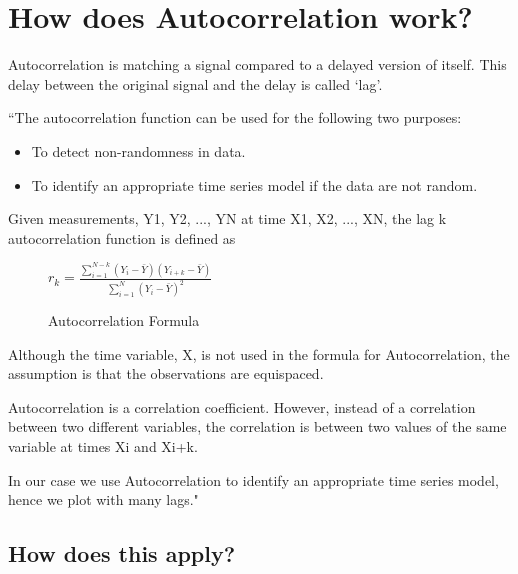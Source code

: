 \section{How does Autocorrelation work?}
Autocorrelation is matching a signal compared to a delayed version of itself. This delay between the original signal and the delay is called ‘lag'. 

``The autocorrelation \cite{Jenkins} function can be used for the following two purposes:

\begin{itemize}

    \item To detect non-randomness in data.
    
    \item To identify an appropriate time series model if the data are not random.
    
\end{itemize}

Given measurements, Y1, Y2, ..., YN at time X1, X2, ..., XN, the lag k autocorrelation function is defined as
\begin{figure}[h]
\centering

\begin{math}
{ {r_{k} = \frac{\sum_{i=1}^{N-k}(Y_{i} - \bar{Y})(Y_{i+k} -  \bar{Y})} {\sum_{i=1}^{N}(Y_{i} - \bar{Y})^{2} }} }
\end{math}

\caption{Autocorrelation Formula}
\label{autocorrolationF}
\end{figure}

Although the time variable, X, is not used in the formula for Autocorrelation, the assumption is that the observations are equispaced.

Autocorrelation is a correlation coefficient. However, instead of a correlation between two different variables, the correlation is between two values of the same variable at times Xi and Xi+k.

In our case we use Autocorrelation to identify an appropriate time series model, hence we plot with many lags." \cite{NIST}

\subsection{How does this apply?}

